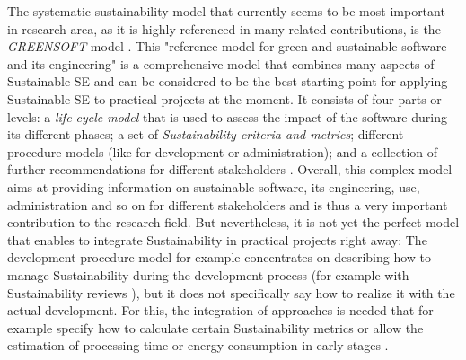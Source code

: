 \documentclass[oribibl]{llncs}
\begin{document}
The systematic sustainability model that currently seems to be most important %
in research area, as it is highly referenced in many related contributions, is the \textit{GREENSOFT} model \cite{naumann_greensoft_2011}. This "reference model for green and sustainable software and its engineering" \cite[p.\,1]{naumann_greensoft_2011} is a comprehensive model that combines many aspects of Sustainable SE %
and can be considered to be the best starting point for applying Sustainable SE to practical projects at the moment. It consists of four parts or levels: a \textit{life cycle model} that is used to assess the impact of the software during its different phases; a set of \textit{Sustainability criteria and metrics}; different procedure models (like for development or administration); and a collection of further recommendations for different stakeholders \cite{naumann_greensoft_2011}.
Overall, this complex model aims at providing information on sustainable software, its engineering, use, administration and so on for different stakeholders and is thus a very important contribution to the research field. But nevertheless, it is not yet the perfect model that enables to integrate Sustainability in practical projects right away: The development procedure model for example concentrates on describing how to manage Sustainability %
during the development process (for example with Sustainability reviews \cite{naumann_greensoft_2011}), but it does not specifically say how to realize it with the actual development. For this, the integration of approaches is needed that for example specify how to calculate certain Sustainability metrics or allow the estimation of processing time or energy consumption in early stages \cite{naumann_greensoft_2011}. %
\end{document}
